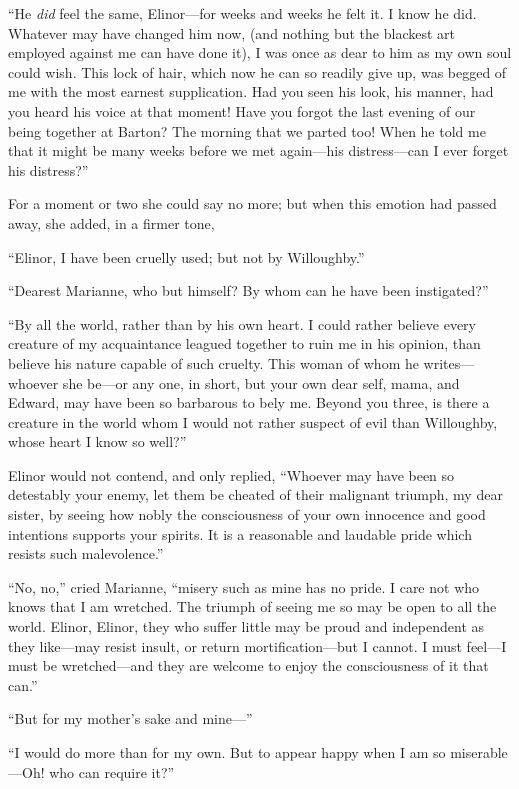 \documentclass{article}
\begin{document}
``He \emph{did} feel the same, Elinor---for weeks and weeks he
felt it.  I know he did.  Whatever may have changed him now, (and
nothing but the blackest art employed against me can have done
it), I was once as dear to him as my own soul could wish.
This lock of hair, which now he can so readily give up,
was begged of me with the most earnest supplication.
Had you seen his look, his manner, had you heard his voice
at that moment!  Have you forgot the last evening of our
being together at Barton?  The morning that we parted
too!  When he told me that it might be many weeks before
we met again---his distress---can I ever forget his distress?''

For a moment or two she could say no more;
but when this emotion had passed away, she added,
in a firmer tone,

``Elinor, I have been cruelly used; but not by Willoughby.''

``Dearest Marianne, who but himself?  By whom can he
have been instigated?''

``By all the world, rather than by his own heart.
I could rather believe every creature of my acquaintance
leagued together to ruin me in his opinion, than believe
his nature capable of such cruelty.  This woman of whom he
writes---whoever she be---or any one, in short, but your own
dear self, mama, and Edward, may have been so barbarous
to bely me.  Beyond you three, is there a creature
in the world whom I would not rather suspect of evil
than Willoughby, whose heart I know so well?''

Elinor would not contend, and only replied,
``Whoever may have been so detestably your enemy, let them
be cheated of their malignant triumph, my dear sister,
by seeing how nobly the consciousness of your own
innocence and good intentions supports your spirits.
It is a reasonable and laudable pride which resists
such malevolence.''

``No, no,'' cried Marianne, ``misery such as mine has
no pride.  I care not who knows that I am wretched.
The triumph of seeing me so may be open to all the world.
Elinor, Elinor, they who suffer little may be proud and
independent as they like---may resist insult, or return
mortification---but I cannot.  I must feel---I must be
wretched---and they are welcome to enjoy the consciousness
of it that can.''

``But for my mother's sake and mine---''

``I would do more than for my own.  But to appear
happy when I am so miserable---Oh! who can require it?''
\end{document}
